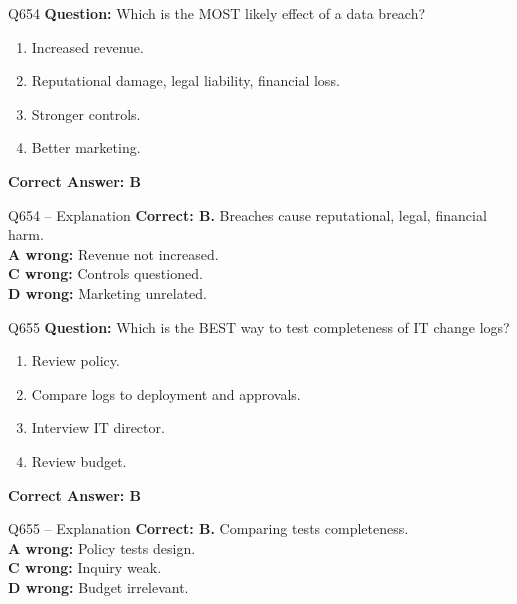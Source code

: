\documentclass[aspectratio=169,10pt]{beamer}
\begin{document}
	\begin{frame}[t]{Q654}
		\small
		\textbf{Question:} Which is the MOST likely effect of a data breach?
		\begin{enumerate}[label=\Alph*.,itemsep=1pt,topsep=2pt]
			\item Increased revenue.
			\item Reputational damage, legal liability, financial loss.
			\item Stronger controls.
			\item Better marketing.
		\end{enumerate}
		\vspace{4pt}
		\textbf{Correct Answer: B}
	\end{frame}
	
	\begin{frame}[t]{Q654 -- Explanation}
		\small
		\textbf{Correct: B.} Breaches cause reputational, legal, financial harm. \\[4pt]
		\textbf{A wrong:} Revenue not increased. \\[2pt]
		\textbf{C wrong:} Controls questioned. \\[2pt]
		\textbf{D wrong:} Marketing unrelated.
	\end{frame}
	
	\begin{frame}[t]{Q655}
		\small
		\textbf{Question:} Which is the BEST way to test completeness of IT change logs?
		\begin{enumerate}[label=\Alph*.,itemsep=1pt,topsep=2pt]
			\item Review policy.
			\item Compare logs to deployment and approvals.
			\item Interview IT director.
			\item Review budget.
		\end{enumerate}
		\vspace{4pt}
		\textbf{Correct Answer: B}
	\end{frame}
	
	\begin{frame}[t]{Q655 -- Explanation}
		\small
		\textbf{Correct: B.} Comparing tests completeness. \\[4pt]
		\textbf{A wrong:} Policy tests design. \\[2pt]
		\textbf{C wrong:} Inquiry weak. \\[2pt]
		\textbf{D wrong:} Budget irrelevant.
	\end{frame}
	
\end{document}
